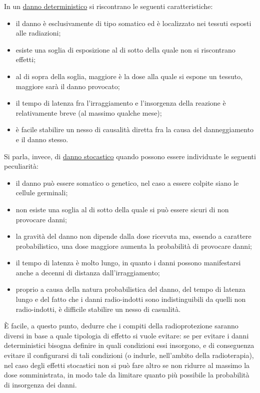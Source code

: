 \documentclass{report}
\numberwithin{equation}{section}
\numberwithin{figure}{section}
\begin{document}
\noindent In un \underline{danno deterministico} si riscontrano le seguenti caratteristiche:
\begin{itemize}[label=$-$]
    \item il danno è esclusivamente di tipo somatico ed è localizzato nei tessuti esposti alle radiazioni;
    \item esiste una soglia di esposizione al di sotto della quale non si riscontrano effetti;
    \item al di sopra della soglia, maggiore è la dose alla quale si espone un tessuto, maggiore sarà il danno provocato;
    \item il tempo di latenza fra l'irraggiamento e l'insorgenza della reazione è relativamente breve (al massimo qualche mese);
    \item è facile stabilire un nesso di causalità diretta fra la causa del danneggiamento e il danno stesso.
\end{itemize}
Si parla, invece, di \underline{danno stocastico} quando possono essere individuate le seguenti peculiarità:
\begin{itemize}[label=$-$]
    \item il danno può essere somatico o genetico, nel caso a essere colpite siano le cellule germinali;
    \item non esiste una soglia al di sotto della quale si può essere sicuri di non provocare danni;
    \item la gravità del danno non dipende dalla dose ricevuta ma, essendo a carattere probabilistico, una dose maggiore aumenta la probabilità di provocare danni;
    \item il tempo di latenza è molto lungo, in quanto i danni possono manifestarsi anche a decenni di distanza dall'irraggiamento;
    \item proprio a causa della natura probabilistica del danno, del tempo di latenza lungo e del fatto che i danni radio-indotti sono indistinguibili da quelli non radio-indotti, è difficile stabilire un nesso di casualità.
\end{itemize}
È facile, a questo punto, dedurre che i compiti della radioprotezione saranno diversi in base a quale tipologia di effetto si vuole evitare: se per evitare i danni deterministici bisogna definire in quali condizioni essi insorgono, e di conseguenza evitare il configurarsi di tali condizioni (o indurle, nell'ambito della radioterapia), nel caso degli effetti stocastici non si può fare altro se non ridurre al massimo la dose somministrata, in modo tale da limitare quanto più possibile la probabilità di insorgenza dei danni.
\end{document}
